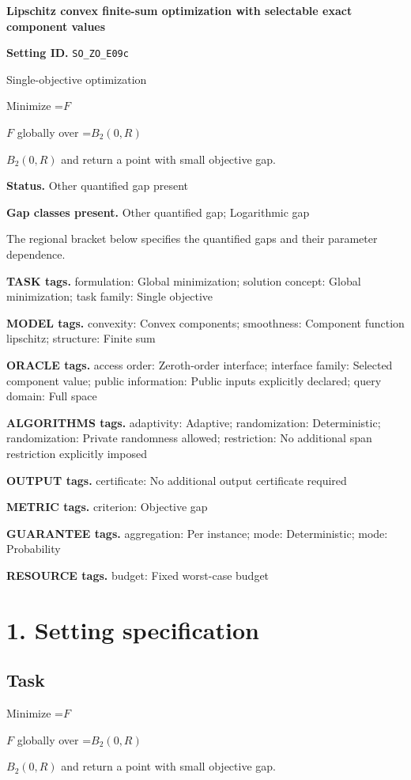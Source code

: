 \documentclass[10pt,a4paper]{article}
\newcommand{\AtlasMath}[1]{\par\begingroup\centering\setbox0=\hbox{$\displaystyle #1$}\ifdim\wd0>1.4\linewidth\typeout{ATLAS WIDE FORMULA: \the\wd0}\fi\ifdim\wd0>\linewidth\resizebox{\linewidth}{!}{\box0}\else\box0\fi\par\endgroup}
\newcommand{\AtlasInlineMath}[1]{\begingroup\setbox0=\hbox{$#1$}\ifdim\wd0>.4\linewidth\endgroup\AtlasMath{#1}\else\endgroup$#1$\fi}
\begin{document}
\raggedright

{\LARGE\bfseries\sffamily\color{AtlasNavy} Lipschitz convex finite-sum optimization with selectable exact component values\par}\vspace{5pt}
\textbf{Setting ID.} \texttt{SO\_\allowbreak{}ZO\_\allowbreak{}E09c}

Single-objective optimization

Minimize \AtlasInlineMath{F} globally over \AtlasInlineMath{B_2(0,R)} and return a point with small objective gap.

\textbf{Status.} Other quantified gap present

\textbf{Gap classes present.} Other quantified gap; Logarithmic gap

The regional bracket below specifies the quantified gaps and their parameter dependence.

\textbf{TASK tags.} formulation: Global minimization; solution concept: Global minimization; task family: Single objective

\textbf{MODEL tags.} convexity: Convex components; smoothness: Component function lipschitz; structure: Finite sum

\textbf{ORACLE tags.} access order: Zeroth-order interface; interface family: Selected component value; public information: Public inputs explicitly declared; query domain: Full space

\textbf{ALGORITHMS tags.} adaptivity: Adaptive; randomization: Deterministic; randomization: Private randomness allowed; restriction: No additional span restriction explicitly imposed

\textbf{OUTPUT tags.} certificate: No additional output certificate required

\textbf{METRIC tags.} criterion: Objective gap

\textbf{GUARANTEE tags.} aggregation: Per instance; mode: Deterministic; mode: Probability

\textbf{RESOURCE tags.} budget: Fixed worst-case budget

\section{1. Setting specification}
\subsection{Task}
Minimize \AtlasInlineMath{F} globally over \AtlasInlineMath{B_2(0,R)} and return a point with small objective gap.
\end{document}
